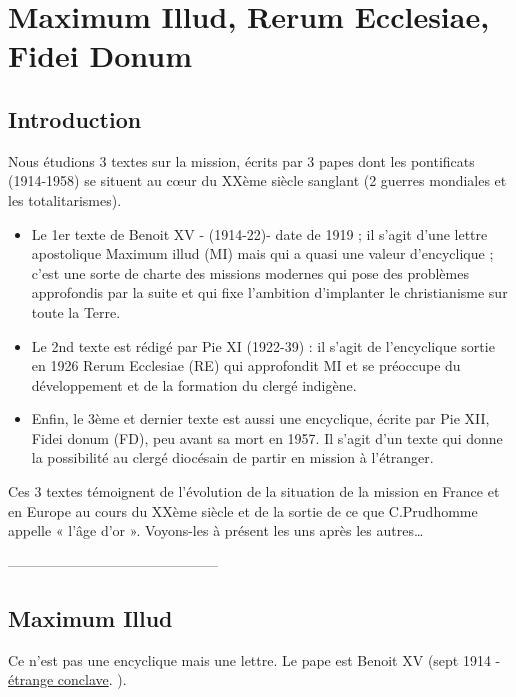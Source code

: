 \chapter{Maximum Illud, Rerum Ecclesiae, Fidei Donum}

\section{Introduction}



Nous étudions 3 textes sur la mission, écrits par 3 papes dont les pontificats (1914-1958) se situent au cœur du XXème siècle sanglant (2 guerres mondiales et les totalitarismes). 
\begin{itemize}
    \item Le 1er texte de Benoit XV - (1914-22)- date de 1919 ; il s’agit d’une lettre apostolique Maximum illud (MI) mais qui a quasi une valeur d’encyclique ; c’est une sorte de charte des missions modernes qui pose des problèmes approfondis par la suite et qui fixe l’ambition d’implanter le christianisme sur toute la Terre. 

    \item Le 2nd texte est rédigé par Pie XI (1922-39) : il s’agit de l’encyclique sortie en 1926 Rerum Ecclesiae (RE) qui approfondit MI et se préoccupe du développement et de la formation du clergé indigène. 

    \item Enfin, le 3ème et dernier texte est aussi une encyclique, écrite par Pie XII, Fidei donum (FD), peu avant sa mort en 1957. Il s’agit d’un texte qui donne la possibilité au clergé diocésain de partir en mission à l’étranger. 
\end{itemize}

Ces 3 textes témoignent de l’évolution de la situation de la mission en France et en Europe au cours du XXème siècle et de la sortie de ce que C.Prudhomme appelle « l’âge d’or ». Voyons-les à présent les uns après les autres…



---------------------------------------------
\section{Maximum Illud}

Ce n'est pas une encyclique mais une lettre. Le pape est Benoit XV (sept 1914 - \href{https://fr.wikipedia.org/wiki/Conclave_de_1914}{étrange conclave}.  ).


